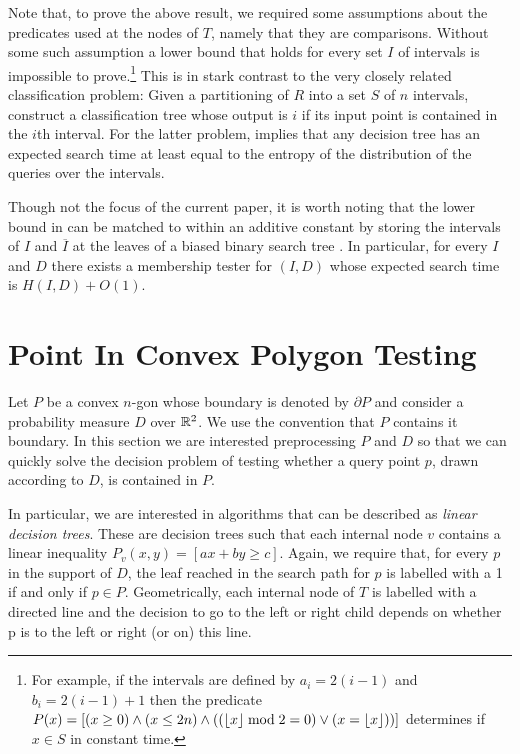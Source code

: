 \documentclass[charterfonts,lotsofwhite]{patmorin}
\begin{document}
Note that, to prove the above result, we required some assumptions
about the predicates used at the nodes of $T$, namely that they are
comparisons.  Without some such assumption a lower bound that holds
for every set $I$ of intervals is impossible to prove.\footnote{For
example, if the intervals are defined by $a_i=2(i-1)$ and
$b_i=2(i-1)+1$ then the predicate $P(x)=[(x\ge 0)\wedge(x\le
2n)\wedge((\left\lfloor x \right\rfloor\bmod 2=0)\vee(x=\left\lfloor x \right\rfloor))]$ determines if $x\in
S$ in constant time.} This is in stark contrast to the very closely
related classification problem: Given a partitioning of $R$ into a set
$S$ of $n$ intervals, construct a classification tree whose output is
$i$ if its input point is contained in the $i$th interval.  For the
latter problem,  implies that any decision tree has an
expected search time at least equal to the entropy of the distribution
of the queries over the intervals. 

Though not the focus of the current paper, it is worth noting that the
lower bound in  can be matched to within an additive
constant by storing the intervals of $I$ and $\overline{I}$ at the
leaves of a biased binary search tree \cite{kXX,mXX}.  In particular,
for every $I$ and $D$ there exists a membership tester for $(I,D)$
whose expected search time is $H(I,D)+O(1)$.

\section{Point In Convex Polygon Testing}

Let $P$ be a convex $n$-gon whose boundary is denoted by $\partial P$
and consider a probability measure $D$ over $\mathbb{R}^2$.  We use the
convention that $P$ contains it boundary.  In this section we are
interested preprocessing $P$ and $D$ so that we can quickly solve the
decision problem of testing whether a query point $p$, drawn according
to $D$, is contained in $P$. 

In particular, we are interested in algorithms that can be described
as \emph{linear decision trees}.  These are decision trees such that
each internal node $v$ contains a linear inequality $P_v(x,y)=[ax+by
\ge c]$.  Again, we require that, for every $p$ in the support of $D$,
the leaf reached in the search path for $p$ is labelled with a 1 if
and only if $p\in P$.  Geometrically, each internal node of $T$ is
labelled with a directed line and the decision to go to the left or
right child depends on whether p is to the left or right (or on) this
line.  
\end{document}
